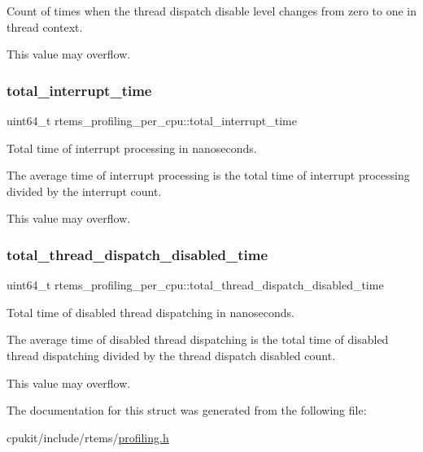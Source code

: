 Count of times when the thread dispatch disable level changes from zero to one in thread context. 

This value may overflow. \mbox{\label{structrtems__profiling__per__cpu_a98a594f04430a4fd78b14b509b3eb7ba}} 
\subsubsection{\texorpdfstring{total\_interrupt\_time}{total\_interrupt\_time}}
{\footnotesize\ttfamily uint64\+\_\+t rtems\+\_\+profiling\+\_\+per\+\_\+cpu\+::total\+\_\+interrupt\+\_\+time}



Total time of interrupt processing in nanoseconds. 

The average time of interrupt processing is the total time of interrupt processing divided by the interrupt count.

This value may overflow. \mbox{\label{structrtems__profiling__per__cpu_a13aec425f945e9f0dd535f4db69a3de3}} 
\subsubsection{\texorpdfstring{total\_thread\_dispatch\_disabled\_time}{total\_thread\_dispatch\_disabled\_time}}
{\footnotesize\ttfamily uint64\+\_\+t rtems\+\_\+profiling\+\_\+per\+\_\+cpu\+::total\+\_\+thread\+\_\+dispatch\+\_\+disabled\+\_\+time}



Total time of disabled thread dispatching in nanoseconds. 

The average time of disabled thread dispatching is the total time of disabled thread dispatching divided by the thread dispatch disabled count.

This value may overflow. 

The documentation for this struct was generated from the following file\+:\begin{DoxyCompactItemize}
\item 
cpukit/include/rtems/\mbox{\hyperlink{profiling_8h}{profiling.\+h}}\end{DoxyCompactItemize}
